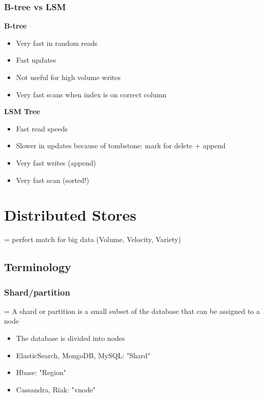 \documentclass{article}
\begin{document}
\subsubsection{B-tree vs LSM}

\textbf{B-tree}

\begin{itemize}
    \item Very fast in random reads
    \item Fast updates
    \item Not useful for high volume writes
    \item Very fast scans when index is on correct column
\end{itemize}

\textbf{LSM Tree}

\begin{itemize}
    \item Fast read speeds
    \item Slower in updates because of tombstone: mark for delete + append
    \item Very fast writes (append)
    \item Very fast scan (sorted!)
\end{itemize}

\section{Distributed Stores}

= perfect match for big data (Volume, Velocity, Variety)

\subsection{Terminology}

\subsubsection{Shard/partition}

= A shard or partition is a small subset of the database that can be assigned to a node

\begin{itemize}
    \item The database is divided into nodes
    \item ElasticSearch, MongoDB, MySQL: "Shard"
    \item Hbase: "Region"
    \item Cassandra, Riak: "vnode"
\end{itemize}
\end{document}

